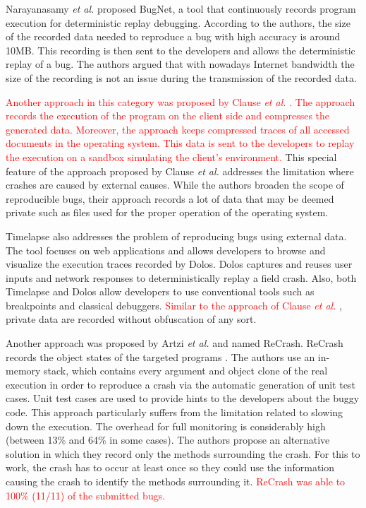 \documentclass[times, doublespace]{smrauth}
\newcommand{\red}[1]{\textcolor{red}{#1}}
\begin{document}
Narayanasamy {\it et al.} \cite{Narayanasamy2005} proposed BugNet, a tool that continuously records program execution for deterministic replay debugging. According to the authors, the size of the recorded data needed to reproduce a bug with high accuracy is around 10MB. This recording is then sent to the developers and allows the deterministic replay of a bug. The authors argued that with nowadays Internet bandwidth the size of the recording is not an issue during the transmission of the recorded data.

\red{Another approach in this category was  proposed by Clause {\it et al.} \cite{Clause2007}. The approach records the execution of the program on the client side and compresses the generated data. Moreover, the approach keeps compressed traces of all accessed documents in the operating system.
This data is sent to the developers to replay the execution on a sandbox simulating the client's environment.}
This special feature of the approach proposed by Clause {\it et al.} addresses the limitation where crashes are caused by external causes. While the authors broaden the scope of reproducible bugs, their approach records a lot of data that may be deemed private such as files used for the proper operation of the operating system.

Timelapse \cite{Burg2013} also addresses the problem of reproducing bugs using external data. The tool focuses on web applications and allows developers to browse and visualize the execution traces recorded by Dolos. Dolos captures and reuses user inputs and network responses to deterministically replay a field crash. Also, both Timelapse and Dolos allow developers to use conventional tools such as breakpoints and classical debuggers. \red{Similar to the approach of Clause {\it et al.} \cite{Clause2007}}, private data are recorded without obfuscation of any sort.

Another approach was proposed by Artzi {\it et al.} and named ReCrash. ReCrash records the object states of the targeted programs \cite{Artzi2008}. The authors use an in-memory stack, which contains every argument and object clone of the real execution in order to reproduce a crash via the automatic generation of unit test cases.
Unit test cases are used to provide hints to the developers about the buggy code.
This approach particularly suffers from the limitation related to slowing down the execution.
The overhead for full monitoring is considerably high (between 13\% and 64\% in some cases).
The authors  propose an alternative solution in which they record only the methods surrounding the crash. For this to work, the crash has to occur at least once so they could use the information causing the crash to identify the methods surrounding it. \red{ReCrash was able to 100\% (11/11) of the submitted bugs.}
\end{document}
